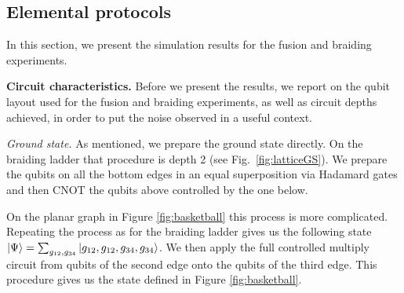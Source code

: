 \documentclass[a4paper,twocolumn,11pt, accepted=2024-06-14]{quantumarticle}
\begin{document}
\subsection{Elemental protocols}\label{sec:num:elem}

In this section, we present the simulation results for the fusion and braiding experiments.

\textbf{Circuit characteristics.} Before we present the results, we report on the qubit layout used for the fusion and braiding experiments, as well as circuit depths achieved, in order to put the noise observed in a useful context.


\emph{Ground state.} As mentioned, we prepare the ground state directly. On the braiding ladder that procedure is depth 2 (see Fig.~\ref{fig:latticeGS}). We prepare the qubits on all the bottom edges in an equal superposition via Hadamard gates and then CNOT the qubits above controlled by the one below. 

On the planar graph in Figure \ref{fig:basketball} this process is more complicated. Repeating the process as for the braiding ladder gives us the following state $\ket{\Psi} = \sum_{g_{12},g_{34}}\ket{g_{12},g_{12}, g_{34}, g_{34}}$. We then apply the full controlled multiply circuit from qubits of the second edge onto the qubits of the third edge. This procedure gives us the state defined in Figure \ref{fig:basketball}.
\end{document}
